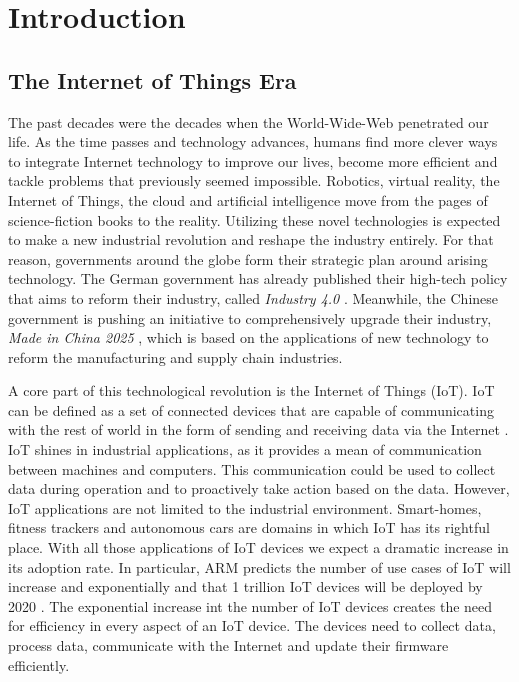 
\chapter{Introduction}{

\section{The Internet of Things Era}{

The past decades were the decades when the World-Wide-Web penetrated our life. As the time passes and technology advances, humans find more clever ways to integrate Internet technology to improve our lives, become more efficient and tackle problems that previously seemed impossible. Robotics, virtual reality, the Internet of Things, the cloud and artificial intelligence move from the pages of science-fiction books to the reality. Utilizing these novel technologies is expected to make a new industrial revolution and reshape the industry entirely. For that reason, governments around the globe form their strategic plan around arising technology. The German government has already published their high-tech policy that aims to reform their industry, called \textit{Industry 4.0} \cite{lasi2014industry}. Meanwhile, the Chinese government is pushing an initiative to comprehensively upgrade their industry, \textit{Made in China 2025} \cite{kennedy2015made}, which is based on the applications of new technology to reform the manufacturing and supply chain industries.

A core part of this technological revolution is the Internet of Things (IoT). IoT can be defined as a set of connected devices that are capable of communicating with the rest of world in the form of sending and receiving data via the Internet \cite{said2013towards}. IoT shines in industrial applications, as it provides a mean of communication between machines and computers. This communication could be used to collect data during operation and to proactively take action based on the data. However, IoT applications are not limited to the industrial environment. Smart-homes, fitness trackers and autonomous cars are domains in which IoT has its rightful place. With all those applications of IoT devices we expect a dramatic increase in its adoption rate. In particular, ARM predicts the number of use cases of IoT will increase and exponentially and that 1 trillion IoT devices will be deployed by 2020 \cite{Sparks2017TheDevices}. The exponential increase int the number of IoT devices creates the need for efficiency in every aspect of an IoT device. The devices need to collect data, process data, communicate with the Internet and update their firmware efficiently.
}

}
